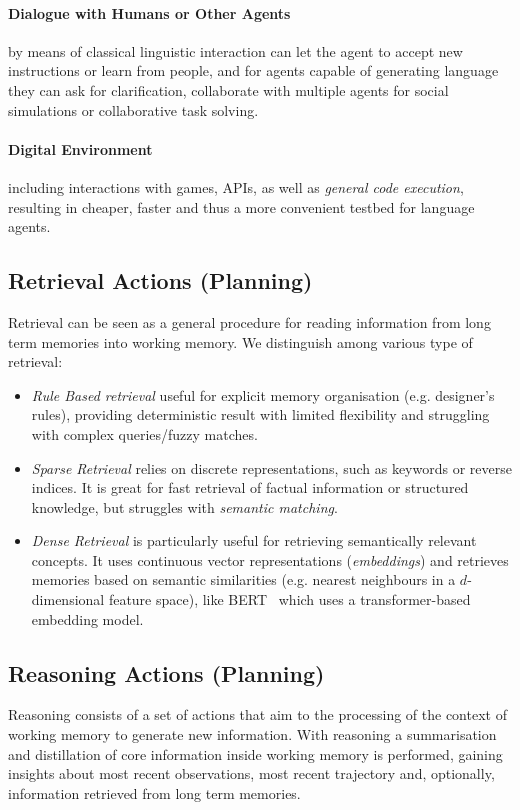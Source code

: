 \paragraph{Dialogue with Humans or Other Agents} by means of classical
linguistic interaction can let the agent to accept new instructions or learn
from people, and for agents capable of generating language they can ask for
clarification, collaborate with multiple agents for social simulations or
collaborative task solving.

\paragraph{Digital Environment} including interactions with games, APIs, as well as
\emph{general code execution}, resulting in cheaper, faster and thus a more convenient
testbed for language agents.

\subsection{Retrieval Actions (Planning)}
Retrieval can be seen as a general procedure for reading information from long
term memories into working memory. We distinguish among various type of
retrieval:
\begin{itemize}
    \item \emph{Rule Based retrieval} useful for explicit memory organisation
        (e.g. designer's rules), providing deterministic result with limited
        flexibility and struggling with complex queries/fuzzy matches.
    \item \emph{Sparse Retrieval} relies on discrete representations, such as
        keywords or reverse indices. It is great for fast retrieval of factual
        information or structured knowledge, but struggles with \emph{semantic
        matching}.
    \item \emph{Dense Retrieval} is particularly useful for retrieving
        semantically relevant concepts. It uses continuous vector
        representations (\emph{embeddings}) and retrieves memories based on
        semantic similarities (e.g. nearest neighbours in a $d$-dimensional
        feature space), like
        BERT~\cite{devlin2019bertpretrainingdeepbidirectional} which uses a
        transformer-based embedding model.
\end{itemize}

\subsection{Reasoning Actions (Planning)}
Reasoning consists of a set of actions that aim to the processing of the
context of working memory to generate new information. With reasoning a
summarisation and distillation of core information inside working memory is
performed, gaining insights about most recent observations, most recent
trajectory and, optionally, information retrieved from long term memories.

